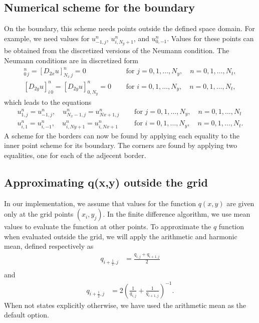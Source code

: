 \documentclass[twoside]{article}
\begin{document}
\subsection{Numerical scheme for the boundary}
On the boundary, this scheme needs points outside the defined space domain. For example, we need values for $u_{-1, j}^{n}$, $u_{i, N_{y}+1}^{n}$, and $u_{0, -1}^{n}$.
Values for these points can be obtained from the discretized versions of the Neumann condition. The Neumann conditions are in discretized form
\begin{align}
[D_{2x} u]_{0\, j}^n = [D_{2x} u]_{N_{x}\, j}^n = 0 & \quad \text{ for } j = 0, 1,\ldots , N_{y}, \quad n = 0, 1, \dots , N_{t}, \\
[D_{2y} u]_{i\, 0}^n = [D_{2y} u]_{0,N_{y}}^n = 0 & \quad \text{ for } i = 0, 1, \dots , N_y, \quad n = 0, 1, \dots , N_{t},
\end{align}
which leads to the equations
\begin{align}
u_{1,j}^n = u_{-1,j}^n ,  \quad u_{N_x-1,j}^n = u_{Nx+1,j}^n  & \quad \text{ for } j = 0, 1, \ldots , N_{y}, \quad n = 0, 1, \ldots , N_{t} \\
u_{i,1}^n = u_{i,-1}^n, \quad u_{i,Ny+1}^n = u_{i,Nx+1}^n & \quad \text{ for } i = 0, 1, \ldots , N_{y},\quad n = 0, 1, \ldots , N_{t}.
\end{align}
A scheme for the borders can now be found by applying each equality to the inner point scheme for its boundary. The corners are found by applying two equalities, one for each of the adjecent border.

\subsection{Approximating q(x,y) outside the grid}

In our implementation, we assume that values for the function $q(x, y)$ are given only at the grid points $(x_{i}, y_{j})$. In the finite difference algorithm, we use mean values to evaluate the function at other points. To approximate the $q$ function when evaluated outside the grid, we will apply the arithmetic and harmonic mean, defined respectively as
\begin{align}
  q_{i+\frac{1}{2},j} &= \frac{q_{i,j} + q_{i+1,j}}{2} \label{armean} \\
\end{align}
and
\begin{align}
  q_{i+\frac{1}{2},j} &= 2 \left(\frac{1}{q_{i,j}} + \frac{1}{q_{i+1,j}}\right)^{-1}. \label{harmean}
\end{align}
When not states explicitly otherwise, we have used the arithmetic mean as the default option.
\end{document}
